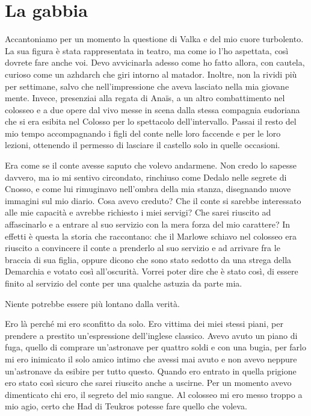 \chapter{La gabbia}

Accantoniamo per un momento la questione di Valka e del mio cuore
turbolento. La sua figura è stata rappresentata in teatro, ma come io
l'ho aspettata, così dovrete fare anche voi. Devo avvicinarla adesso
come ho fatto allora, con cautela, curioso come un azhdarch che giri
intorno al matador. Inoltre, non la rividi più per settimane, salvo che
nell'impressione che aveva lasciato nella mia giovane mente. Invece,
presenziai alla regata di Anaïs, a un altro combattimento nel colosseo e
a due opere dal vivo messe in scena dalla stessa compagnia eudoriana che
si era esibita nel Colosso per lo spettacolo dell'intervallo. Passai il
resto del mio tempo accompagnando i figli del conte nelle loro faccende
e per le loro lezioni, ottenendo il permesso di lasciare il castello
solo in quelle occasioni.

Era come se il conte avesse saputo che volevo andarmene. Non credo lo
sapesse davvero, ma io mi sentivo circondato, rinchiuso come Dedalo
nelle segrete di Cnosso, e come lui rimuginavo nell'ombra della mia
stanza, disegnando nuove immagini sul mio diario. Cosa avevo creduto?
Che il conte si sarebbe interessato alle mie capacità e avrebbe
richiesto i miei servigi? Che sarei riuscito ad affascinarlo e a entrare
al suo servizio con la mera forza del mio carattere? In effetti è questa
la storia che raccontano: che il Marlowe schiavo nel colosseo era
riuscito a convincere il conte a prenderlo al suo servizio e ad arrivare
fra le braccia di sua figlia, oppure dicono che sono stato sedotto da
una strega della Demarchia e votato così all'oscurità. Vorrei poter dire
che è stato così, di essere finito al servizio del conte per una qualche
astuzia da parte mia.

Niente potrebbe essere più lontano dalla verità.

Ero là perché mi ero sconfitto da solo. Ero vittima dei miei stessi
piani, per prendere a prestito un'espressione dell'inglese classico.
Avevo avuto un piano di fuga, quello di comprare un'astronave per
quattro soldi e con una bugia, per farlo mi ero inimicato il solo amico
intimo che avessi mai avuto e non avevo neppure un'astronave da esibire
per tutto questo. Quando ero entrato in quella prigione ero stato così
sicuro che sarei riuscito anche a uscirne. Per un momento avevo
dimenticato chi ero, il segreto del mio sangue. Al colosseo mi ero messo
troppo a mio agio, certo che Had di Teukros potesse fare quello che
voleva.

